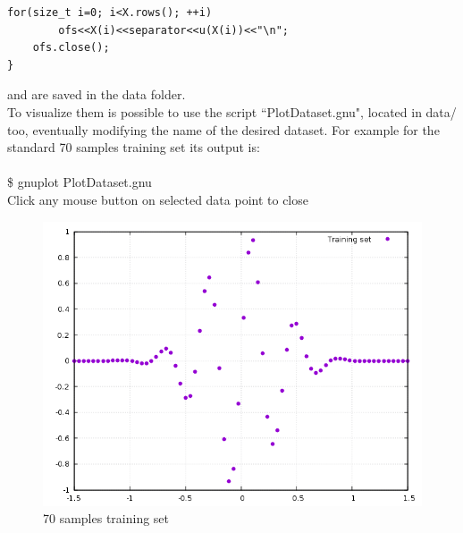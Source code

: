 \documentclass[12pt, a4paper]{report}
\theoremstyle{definition}
\begin{document}
{\begin{lstlisting}[frame=single, showstringspaces=false]
	for(size_t i=0; i<X.rows(); ++i)
		ofs<<X(i)<<separator<<u(X(i))<<"\n";
	ofs.close();
}
\end{lstlisting}
and are saved in the data folder.\\
To visualize them is possible to use the \cite{gnuplot} script ``PlotDataset.gnu", located in data/ too, eventually modifying the name of the desired dataset. For example for the standard 70 samples training set its output is:\\
{\\ \ttfamily \$ gnuplot PlotDataset.gnu\\
Click any mouse button on selected data point to close}
\begin{figure}[H]
	\centering
	\includegraphics[width=\textwidth]{img/TrainingSet70}
	\caption{70 samples training set}
\end{figure}

}
\end{document}

